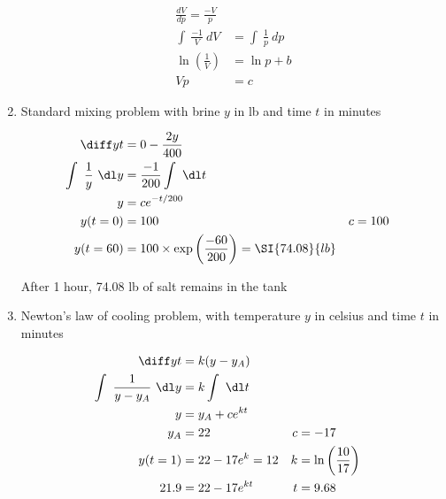\begin{enumerate}
          \begin{align}
              \frac{dV}{dp} = \frac{-V}{p}                           \\
              \int\ \frac{-1}{V}\ dV       & = \int\ \frac{1}{p}\ dp \\
              \ln \left(\frac{1}{V}\right) & = \ln p + b             \\
              Vp                           & = c
          \end{align}


    \item Standard mixing problem with brine $ y $ in lb and time $ t $ in minutes

          \begin{align}
              \diff yt                 & = 0 - \frac{2y}{400}                      \\
              \int\ \frac{1}{y}\ \dl y & = \frac{-1}{200} \int\ \dl t              \\
              y                        & = c e^{-t/200}                            \\
              y(t = 0)                 & = 100                                   &
              c                        & = 100                                     \\
              y(t = 60)                & = 100 \times \exp \left(\frac{-60}{200}
              \right) = \SI{74.08}{lb}
          \end{align}

          After 1 hour, 74.08 lb of salt remains in the tank

    \item Newton's law of cooling problem, with temperature $ y $ in celsius and time
          $ t $ in minutes

          \begin{align}
              \diff yt                         & = k(y - y_{A})                   \\
              \int\ \frac{1}{y - y_{A}}\ \dl y & = k \int\ \dl t                  \\
              y                                & = y_{A} + c e^{kt}               \\
              y_{A}                            & = 22                 & c & = -17 \\
              y(t = 1)                         & = 22 - 17 e^{k} = 12 & k & = \ln
              \left(\frac{10}{17}\right)                                          \\
              21.9                             & = 22 - 17e^{kt}      & t & =9.68
          \end{align}


\end{enumerate}
